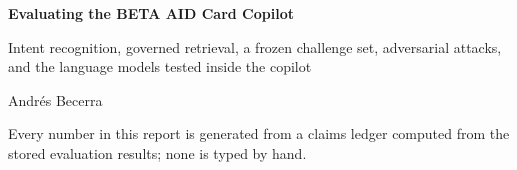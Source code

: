 \begin{titlepage}
  \centering
  \vspace*{0.2\textheight}
  {\Huge\bfseries Evaluating the BETA AID Card Copilot\par}
  \vspace{1.5em}
  {\Large Intent recognition, governed retrieval, a frozen challenge set, adversarial attacks, and the language
  models tested inside the copilot\par}
  \vspace{3em}
  {\large Andrés Becerra\par}
  \vspace{1em}
  {\large \reportdate\par}
  \vfill
  {\small Every number in this report is generated from a claims ledger computed from the stored evaluation
  results; none is typed by hand.\par}
\end{titlepage}
